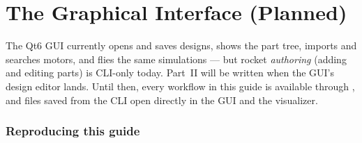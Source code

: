 \documentclass[11pt,letterpaper]{article}
\begin{document}
\clearpage


\clearpage
\part{The Graphical Interface (Planned)}\label{part:gui}

\begin{note}
The Qt6 GUI currently opens and saves  designs, shows the part tree,
imports and searches motors, and flies the same simulations --- but rocket
\emph{authoring} (adding and editing parts) is CLI-only today. Part~II will be
written when the GUI's design editor lands. Until then, every workflow in this
guide is available through , and  files saved from
the CLI open directly in the GUI and the visualizer.
\end{note}

\clearpage
\appendix
\section{Reproducing this guide}\label{app:repro}

\end{document}
